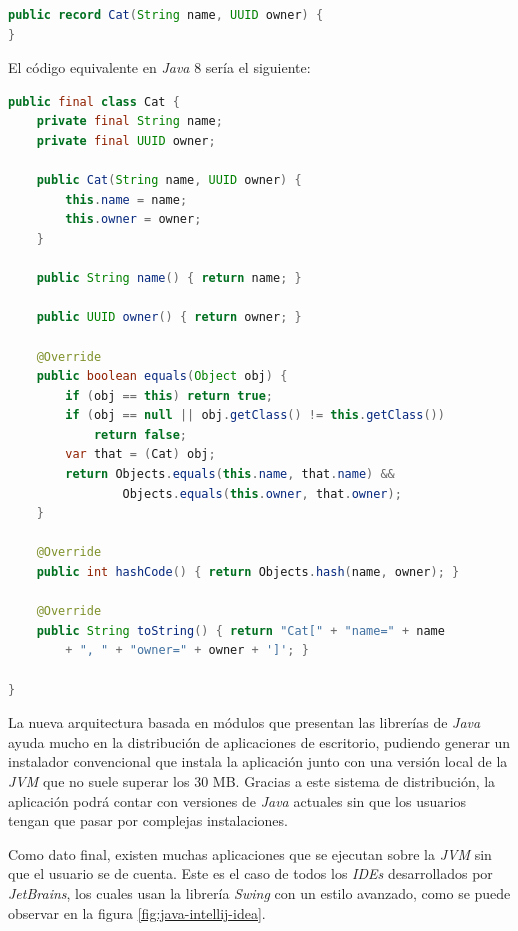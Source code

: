 \begin{lstlisting}[language=Java,style=java,frame=single,label={lst:java-comparacion-18}]
public record Cat(String name, UUID owner) {
}
\end{lstlisting}

El código equivalente en \textit{Java} 8 sería el siguiente:

\begin{lstlisting}[language=Java,style=java,frame=single,label={lst:java-comparacion-8}]
public final class Cat {
    private final String name;
    private final UUID owner;

    public Cat(String name, UUID owner) {
        this.name = name;
        this.owner = owner;
    }

    public String name() { return name; }

    public UUID owner() { return owner; }

    @Override
    public boolean equals(Object obj) {
        if (obj == this) return true;
        if (obj == null || obj.getClass() != this.getClass())
            return false;
        var that = (Cat) obj;
        return Objects.equals(this.name, that.name) &&
                Objects.equals(this.owner, that.owner);
    }

    @Override
    public int hashCode() { return Objects.hash(name, owner); }

    @Override
    public String toString() { return "Cat[" + "name=" + name
        + ", " + "owner=" + owner + ']'; }

}
\end{lstlisting}

La nueva arquitectura basada en módulos que presentan las librerías de \textit{Java}
ayuda mucho en la distribución de aplicaciones de escritorio, pudiendo generar un instalador
convencional que instala la aplicación junto con una versión local de la \textit{JVM} que no
suele superar los 30 MB\cite{JPACKAGE}.
Gracias a este sistema de distribución, la aplicación podrá contar con versiones
de \textit{Java} actuales sin que los usuarios tengan que pasar por complejas instalaciones.

Como dato final, existen muchas aplicaciones que se ejecutan sobre la \textit{JVM}
sin que el usuario se de cuenta.
Este es el caso de todos los \textit{IDEs} desarrollados por \textit{JetBrains}, los cuales
usan la librería \textit{Swing} con un estilo avanzado, como se puede observar en la figura
\ref{fig:java-intellij-idea}.

